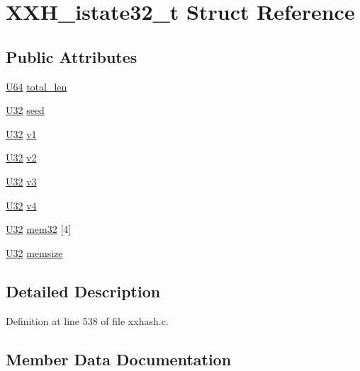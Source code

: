 \hypertarget{struct_x_x_h__istate32__t}{}\section{X\+X\+H\+\_\+istate32\+\_\+t Struct Reference}
\label{struct_x_x_h__istate32__t}
\subsection*{Public Attributes}
\begin{DoxyCompactItemize}
\item 
\hyperlink{xxhash_8c_a24c386d3758eba951eb7532fdbb45804}{U64} \hyperlink{struct_x_x_h__istate32__t_a8b358b224ecd8fe9412e90d1bc7d0261}{total\+\_\+len}
\item 
\hyperlink{xxhash_8c_ac3df7cf3c8cb172a588adec881447d68}{U32} \hyperlink{struct_x_x_h__istate32__t_aa838ccfe91463ae3508ca756efdd3ca5}{seed}
\item 
\hyperlink{xxhash_8c_ac3df7cf3c8cb172a588adec881447d68}{U32} \hyperlink{struct_x_x_h__istate32__t_abe7ccbc29303d4f4126d7c1c6003e67a}{v1}
\item 
\hyperlink{xxhash_8c_ac3df7cf3c8cb172a588adec881447d68}{U32} \hyperlink{struct_x_x_h__istate32__t_a2e56f8d3931253d5706f6354c228e7c4}{v2}
\item 
\hyperlink{xxhash_8c_ac3df7cf3c8cb172a588adec881447d68}{U32} \hyperlink{struct_x_x_h__istate32__t_ae19dc091e2c1c51e516024137603cd4a}{v3}
\item 
\hyperlink{xxhash_8c_ac3df7cf3c8cb172a588adec881447d68}{U32} \hyperlink{struct_x_x_h__istate32__t_a8ca5625843153eb81437e9cee7364c1c}{v4}
\item 
\hyperlink{xxhash_8c_ac3df7cf3c8cb172a588adec881447d68}{U32} \hyperlink{struct_x_x_h__istate32__t_a5a135d71eca5187fe5d12890cb7c76d4}{mem32} \mbox{[}4\mbox{]}
\item 
\hyperlink{xxhash_8c_ac3df7cf3c8cb172a588adec881447d68}{U32} \hyperlink{struct_x_x_h__istate32__t_ad84d2d64d2867bca27555196bff172d3}{memsize}
\end{DoxyCompactItemize}


\subsection{Detailed Description}


Definition at line 538 of file xxhash.\+c.



\subsection{Member Data Documentation}
\hypertarget{struct_x_x_h__istate32__t_a5a135d71eca5187fe5d12890cb7c76d4}{}

